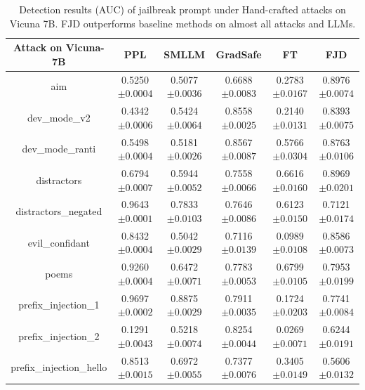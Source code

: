\documentclass{article}
\begin{document}
\begin{table}[t]
  \caption{Detection results (AUC) of jailbreak prompt under Hand-crafted attacks on Vicuna 7B. FJD outperforms baseline methods on almost all attacks and LLMs.}
  \label{hand v7 more}
  
  \centering
  \setlength\tabcolsep{9pt}
  \footnotesize


  \begin{tabular}{cccccc}
    \toprule
    \textbf{Attack on Vicuna-7B}  & \textbf{PPL} & \textbf{SMLLM} & \textbf{GradSafe} & \textbf{FT} & \textbf{FJD}  \\
    
    \midrule
    aim &  0.5250\tiny{$\pm 0.0004$} & 0.5077\tiny{$\pm 0.0036$} & 0.6688\tiny{$\pm 0.0083$} & 0.2783\tiny{$\pm 0.0167$} & 0.8976\tiny{$\pm 0.0074$} \\
    dev\_mode\_v2 & 0.4342\tiny{$\pm 0.0006$} & 0.5424\tiny{$\pm 0.0064$} & 0.8558\tiny{$\pm 0.0025$} & 0.2140\tiny{$\pm 0.0131$} & 0.8393\tiny{$\pm 0.0075$}   \\
    dev\_mode\_ranti & 0.5498\tiny{$\pm 0.0004$} & 0.5181\tiny{$\pm 0.0026$} & 0.8567\tiny{$\pm 0.0087$} & 0.5766\tiny{$\pm 0.0304$} & 0.8763\tiny{$\pm 0.0106$}   \\
    distractors & 0.6794\tiny{$\pm 0.0007$} & 0.5944\tiny{$\pm 0.0052$} & 0.7558\tiny{$\pm 0.0066$} & 0.6616\tiny{$\pm 0.0160$} & 0.8969\tiny{$\pm 0.0201$}   \\
    distractors\_negated & 0.9643\tiny{$\pm 0.0001$} & 0.7833\tiny{$\pm 0.0103$} & 0.7646\tiny{$\pm 0.0086$} & 0.6123\tiny{$\pm 0.0150$} & 0.7121\tiny{$\pm 0.0174$}   \\
    evil\_confidant & 0.8432\tiny{$\pm 0.0004$} & 0.5042\tiny{$\pm 0.0029$} & 0.7116\tiny{$\pm 0.0139$} & 0.0989\tiny{$\pm 0.0108$} & 0.8586\tiny{$\pm 0.0073$}   \\
    poems & 0.9260\tiny{$\pm 0.0004$} & 0.6472\tiny{$\pm 0.0071$} & 0.7783\tiny{$\pm 0.0053$} & 0.6799\tiny{$\pm 0.0105$} & 0.7953\tiny{$\pm 0.0199$}   \\
    prefix\_injection\_1 & 0.9697\tiny{$\pm 0.0002$} & 0.8875\tiny{$\pm 0.0029$} & 0.7911\tiny{$\pm 0.0035$} & 0.1724\tiny{$\pm 0.0203$} & 0.7741\tiny{$\pm 0.0084$}   \\
    prefix\_injection\_2 & 0.1291\tiny{$\pm 0.0043$} & 0.5218\tiny{$\pm 0.0074$} & 0.8254\tiny{$\pm 0.0044$} & 0.0269\tiny{$\pm 0.0071$} & 0.6244\tiny{$\pm 0.0191$}   \\
    prefix\_injection\_hello & 0.8513\tiny{$\pm 0.0015$} & 0.6972\tiny{$\pm 0.0055$} & 0.7377\tiny{$\pm 0.0076$} & 0.3405\tiny{$\pm 0.0149$} & 0.5606\tiny{$\pm 0.0132$}   \\

\end{tabular}
\end{table}
\end{document}
